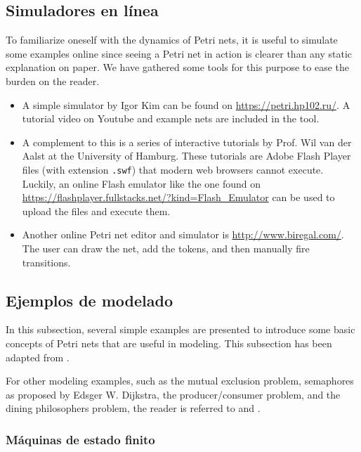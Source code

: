\subsection{Simuladores en línea}

To familiarize oneself with the dynamics of Petri nets,
it is useful to simulate some examples online
since seeing a Petri net in action is clearer than any static explanation on paper.
We have gathered some tools for this purpose to ease the burden on the reader.

\begin{itemize}
      \item A simple simulator by Igor Kim can be found on \url{https://petri.hp102.ru/}.
            A tutorial video on Youtube and example nets are included in the tool.
      \item A complement to this is a series of interactive tutorials by Prof. Wil van der Aalst
            at the University of Hamburg. These tutorials are Adobe Flash Player files (with extension \texttt{.swf})
            that modern web browsers cannot execute.
            Luckily, an online Flash emulator like the one found on \url{https://flashplayer.fullstacks.net/?kind=Flash_Emulator}
            can be used to upload the files and execute them.
      \item Another online Petri net editor and simulator is \url{http://www.biregal.com/}.
            The user can draw the net, add the tokens, and then manually fire transitions.
\end{itemize}

\subsection{Ejemplos de modelado}

In this subsection, several simple examples are presented to introduce
some basic concepts of Petri nets that are useful in modeling.
This subsection has been adapted from \cite{murata1989}.

For other modeling examples, such as the mutual exclusion problem,
semaphores as proposed by Edsger W. Dijkstra, the producer/consumer problem,
and the dining philosophers problem, the reader is referred to
\cite[Chap. 3]{peterson1981} and \cite{reisig2013}.

\subsubsection{Máquinas de estado finito}

